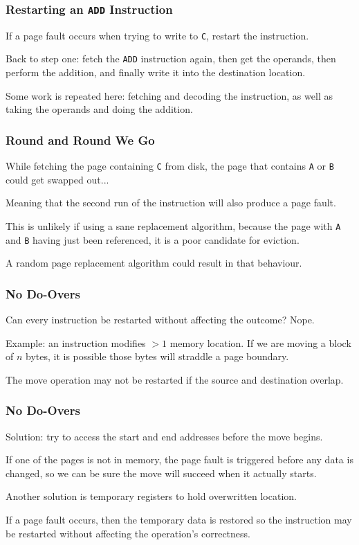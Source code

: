 \begin{frame}
\frametitle{Restarting an \texttt{ADD} Instruction}

If a page fault occurs when trying to write to \texttt{C}, restart the instruction. 

Back to step one: fetch the \texttt{ADD} instruction again, then get the operands, then perform the addition, and finally write it into the destination location.

Some work is repeated here: fetching and decoding the instruction, as well as taking the operands and doing the addition. 

\end{frame}

\begin{frame}
\frametitle{Round and Round We Go}

While fetching the page containing \texttt{C} from disk, the page that contains \texttt{A} or \texttt{B} could get swapped out...

Meaning that the second run of the instruction will also produce a page fault. 

This is unlikely if using a sane replacement algorithm, because the page with \texttt{A} and \texttt{B} having just been referenced, it is a poor candidate for eviction. 

A random page replacement algorithm could result in that behaviour.

\end{frame}

\begin{frame}
\frametitle{No Do-Overs}

Can every instruction be restarted without affecting the outcome? Nope.

Example: an instruction modifies $> 1$ memory location. If we are moving a block of $n$ bytes, it is possible those bytes will straddle a page boundary.

The move operation may not be restarted if the source and destination overlap.

\end{frame}

\begin{frame}
\frametitle{No Do-Overs}

Solution: try to access the start and end addresses before the move begins. 

If one of the pages is not in memory, the page fault is triggered before any data is changed, so we can be sure the move will succeed when it actually starts. 

Another solution is temporary registers to hold overwritten location. 

If a page fault occurs, then the temporary data is restored so the instruction may be restarted without affecting the operation's correctness.

\end{frame}

